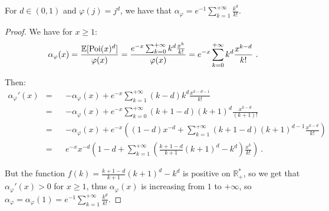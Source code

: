\begin{proposition}
  For $d \in (0,1)$ and $\varphi(j)=j^d$, we have that $\alpha_{\varphi} = e^{-1}\sum_{k=1}^{+\infty}\frac{k^d}{k!}$.
    \label{prop:dPower}
\end{proposition}
\begin{proof}
  We have for $x \geq 1$:
    \[\alpha_{\varphi}(x) = \frac{\mathbb{E}[\operatorname{\text{Poi}}(x)^d]}{\varphi(x)} = \frac{e^{-x}\sum_{k=0}^{+\infty}k^d\frac{x^k}{k!}}{\varphi(x)} = e^{-x}\sum_{k=0}^{+\infty}k^d\frac{x^{k-d}}{k!} \ . \]

   Then:
   \begin{equation}
     \begin{aligned}
       \alpha_{\varphi}'(x) &=&& -\alpha_{\varphi}(x)+ e^{-x}\sum_{k=1}^{+\infty}(k-d)k^d\frac{x^{k-d-1}}{k!} \\
       &=&& -\alpha_{\varphi}(x)+ e^{-x}\sum_{k=0}^{+\infty}(k+1-d)(k+1)^d\frac{x^{k-d}}{(k+1)!}\\
       &=&& -\alpha_{\varphi}(x)+ e^{-x}\left((1-d)x^{-d} +  \sum_{k=1}^{+\infty}(k+1-d)(k+1)^{d-1}\frac{x^{k-d}}{k!}\right)\\
       &=&& e^{-x}x^{-d}\left(1-d + \sum_{k=1}^{+\infty}\left(\frac{k+1-d}{k+1}(k+1)^d - k^d\right)\frac{x^k}{k!}\right) \ . 
     \end{aligned}
   \end{equation}

   But the function $f(k) = \frac{k+1-d}{k+1}(k+1)^d - k^d$ is positive on $\mathbb{R}_+^*$, so we get that $\alpha_{\varphi}'(x) > 0$ for $x \geq 1$, thus $\alpha_{\varphi}(x)$ is increasing from $1$ to $+\infty$, so $\alpha_{\varphi} = \alpha_{\varphi}(1) = e^{-1}\sum_{k=1}^{+\infty}\frac{k^d}{k!}$.
\end{proof}


